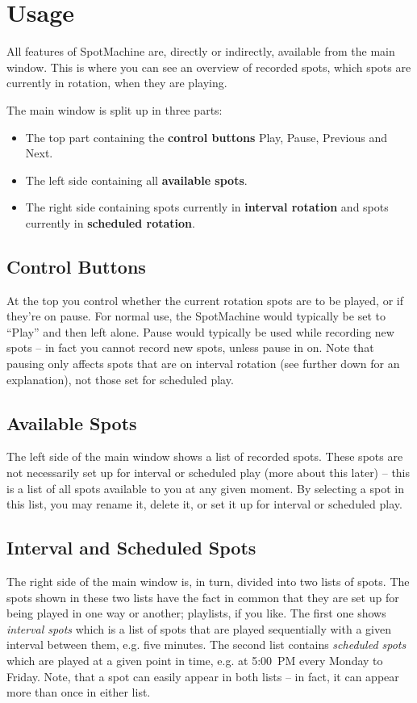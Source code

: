 \documentclass[a4paper,12pt]{article}
\begin{document}
\section{Usage}
All features of SpotMachine are, directly or indirectly, available from the main window. This is where you can see an overview of recorded spots, which spots are currently in rotation, when they are playing.

The main window is split up in three parts:
\begin{itemize}
\item The top part containing the {\bf control buttons} Play, Pause, Previous and Next.
\item The left side containing all {\bf available spots}.
\item The right side containing spots currently in {\bf interval rotation} and spots currently in {\bf scheduled rotation}.
\end{itemize}

\subsection{Control Buttons}
At the top you control whether the current rotation spots are to be played, or if they're on pause. For normal use, the SpotMachine would typically be set to ``Play'' and then left alone. Pause would typically be used while recording new spots -- in fact you cannot record new spots, unless pause in on. Note that pausing only affects spots that are on interval rotation (see further down for an explanation), not those set for scheduled play. %

\subsection{Available Spots}
The left side of the main window shows a list of recorded spots. These spots are not necessarily set up for interval or scheduled play (more about this later) -- this is a list of all spots available to you at any given moment. By selecting a spot in this list, you may rename it, delete it, or set it up for interval or scheduled play.

\subsection{Interval and Scheduled Spots}
The right side of the main window is, in turn, divided into two lists of spots. The spots shown in these two lists have the fact in common that they are set up for being played in one way or another; playlists, if you like. The first one shows {\em interval spots} which is a list of spots that are played sequentially with a given interval between them, e.g. five minutes. The second list contains {\em scheduled spots} which are played at a given point in time, e.g. at 5:00~PM every Monday to Friday. Note, that a spot can easily appear in both lists -- in fact, it can appear more than once in either list.
\end{document}
